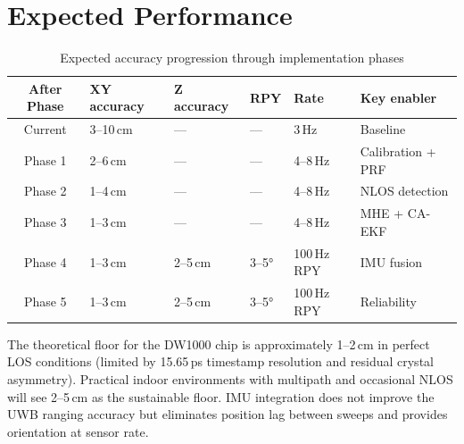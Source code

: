 \documentclass[11pt,a4paper]{article}
\begin{document}
\section{Expected Performance}

\begin{table}[h!]
\centering
\caption{Expected accuracy progression through implementation phases}
\begin{tabular}{clllll}
\toprule
\textbf{After Phase} & \textbf{XY accuracy} & \textbf{Z accuracy} & \textbf{RPY} & \textbf{Rate} & \textbf{Key enabler} \\
\midrule
Current & 3--10\,cm & --- & --- & 3\,Hz & Baseline \\
Phase 1 & 2--6\,cm  & --- & --- & 4--8\,Hz & Calibration + PRF \\
Phase 2 & 1--4\,cm  & --- & --- & 4--8\,Hz & NLOS detection \\
Phase 3 & 1--3\,cm  & --- & --- & 4--8\,Hz & MHE + CA-EKF \\
Phase 4 & 1--3\,cm  & 2--5\,cm & 3--5° & 100\,Hz RPY & IMU fusion \\
Phase 5 & 1--3\,cm  & 2--5\,cm & 3--5° & 100\,Hz RPY & Reliability \\
\bottomrule
\end{tabular}
\end{table}

The theoretical floor for the DW1000 chip is approximately 1--2\,cm in perfect LOS conditions (limited by 15.65\,ps timestamp resolution and residual crystal asymmetry). Practical indoor environments with multipath and occasional NLOS will see 2--5\,cm as the sustainable floor. IMU integration does not improve the UWB ranging accuracy but eliminates position lag between sweeps and provides orientation at sensor rate.
\end{document}
